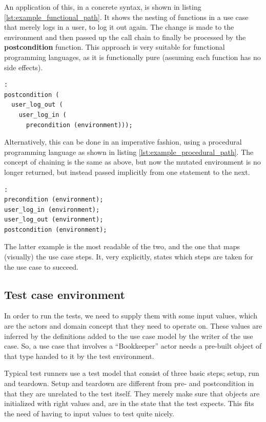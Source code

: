 \noindent An application of this, in a concrete syntax, is shown in listing \ref{lst:example_functional_path}. It shows the nesting of functions in a use case that merely logs in a user, to log it out again. The change is made to the environment and then passed up the call chain to finally be processed by the \textbf{postcondition} function. This approach is very suitable for functional programming languages, as it is functionally pure (assuming each function has no side effects).

\begin{lstlisting}[caption=Example evaluation of a functional call chain,label={lst:example_functional_path}]:
postcondition (
  user_log_out (
    user_log_in (
      precondition (environment)));
\end{lstlisting}

\noindent Alternatively, this can be done in an imperative fashion, using a procedural programming language as shown in listing \ref{lst:example_procedural_path}. The concept of chaining is the same as above, but now the mutated environment is no longer returned, but instead passed implicitly from one statement to the next.

\begin{lstlisting}[caption=Example evaluation of a procedural call chain,label={lst:example_procedural_path}]:
precondition (environment);
user_log_in (environment);
user_log_out (environment);
postcondition (environment);
\end{lstlisting}

\noindent The latter example is the most readable of the two, and the one that maps (visually) the use case steps. It, very explicitly, states which steps are taken for the use case to succeed.

\subsection{Test case environment}
\label{sec:test_case_state}
In order to run the tests, we need to supply them with some input values, which are the actors and domain concept that they need to operate on. These values are inferred by the definitions added to the use case model by the writer of the use case. So, a use case that involves a ``Bookkeeper'' actor needs a pre-built object of that type handed to it by the test environment.\medskip

\noindent Typical test runners use a test model that consist of three basic steps; setup, run and teardown. Setup and teardown are different from pre- and postcondition in that they are unrelated to the test itself. They merely make sure that objects are initialized with right values and, are in the state that the test expects. This fits the need of having to input values to test quite nicely.\medskip

